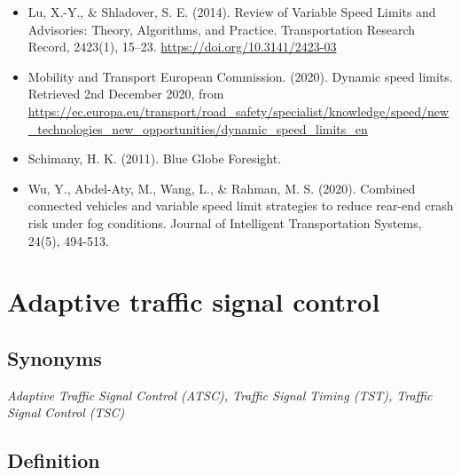 \documentclass[
]{book}
\begin{document}
\begin{itemize}
\item
  Lu, X.-Y., \& Shladover, S. E. (2014). Review of Variable Speed Limits and Advisories: Theory, Algorithms, and Practice. Transportation Research Record, 2423(1), 15--23. \url{https://doi.org/10.3141/2423-03}
\item
  Mobility and Transport \textbar{} European Commission. (2020). Dynamic speed limits. Retrieved 2nd December 2020, from \url{https://ec.europa.eu/transport/road_safety/specialist/knowledge/speed/new_technologies_new_opportunities/dynamic_speed_limits_en}
\item
  Schimany, H. K. (2011). Blue Globe Foresight.
\item
  Wu, Y., Abdel-Aty, M., Wang, L., \& Rahman, M. S. (2020). Combined connected vehicles and variable speed limit strategies to reduce rear-end crash risk under fog conditions. Journal of Intelligent Transportation Systems, 24(5), 494-513.
\end{itemize}

\hypertarget{adaptive_traffic_control}{%
\section{Adaptive traffic signal control}\label{adaptive_traffic_control}}

\hypertarget{synonyms-7}{%
\subsection*{Synonyms}\label{synonyms-7}}

\emph{Adaptive Traffic Signal Control (ATSC), Traffic Signal Timing (TST), Traffic Signal Control (TSC)}

\hypertarget{definition-7}{%
\subsection*{Definition}\label{definition-7}}
\end{document}
